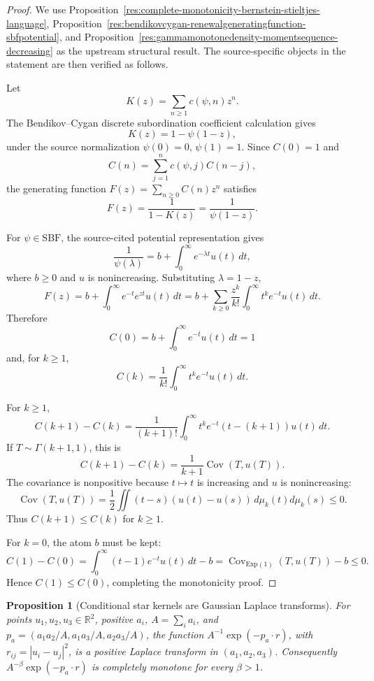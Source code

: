 \documentclass[11pt]{article}
\numberwithin{equation}{section}
\newtheorem{proposition}[theorem]{Proposition}
\theoremstyle{definition}
\theoremstyle{remark}
\newcommand{\1}{\mathbf 1}
\begin{document}
\begin{proof}
We use Proposition~\ref{res:complete-monotonicity-bernstein-stieltjes-language}, Proposition~\ref{res:bendikovcygan-renewalgeneratingfunction-sbfpotential}, and Proposition~\ref{res:gammamonotonedensity-momentsequence-decreasing} as the upstream structural result. The source-specific objects in the statement are then verified as follows.

Let
\[
K(z)=\sum_{n\ge1}c(\psi,n)z^n.
\]
The Bendikov--Cygan discrete subordination coefficient calculation gives
\[
K(z)=1-\psi(1-z),
\]
under the source normalization \(\psi(0)=0\), \(\psi(1)=1\). Since \(C(0)=1\) and
\[
C(n)=\sum_{j=1}^{n}c(\psi,j)C(n-j),
\]
the generating function \(F(z)=\sum_{n\ge0}C(n)z^n\) satisfies
\[
F(z)=\frac{1}{1-K(z)}=\frac{1}{\psi(1-z)}.
\]

For \(\psi\in\mathrm{SBF}\), the source-cited potential representation gives
\[
\frac{1}{\psi(\lambda)}
=b+\int_0^\infty e^{-\lambda t}u(t)\,dt,
\]
where \(b\ge0\) and \(u\) is nonincreasing. Substituting \(\lambda=1-z\),
\[
F(z)=b+\int_0^\infty e^{-t}e^{zt}u(t)\,dt
=b+\sum_{k\ge0}\frac{z^k}{k!}\int_0^\infty t^k e^{-t}u(t)\,dt.
\]
Therefore
\[
C(0)=b+\int_0^\infty e^{-t}u(t)\,dt=1
\]
and, for \(k\ge1\),
\[
C(k)=\frac1{k!}\int_0^\infty t^k e^{-t}u(t)\,dt.
\]

For \(k\ge1\),
\[
C(k+1)-C(k)
=\frac1{(k+1)!}\int_0^\infty t^k e^{-t}(t-(k+1))u(t)\,dt.
\]
If \(T\sim\Gamma(k+1,1)\), this is
\[
C(k+1)-C(k)=\frac1{k+1}\operatorname{Cov}(T,u(T)).
\]
The covariance is nonpositive because \(t\mapsto t\) is increasing and \(u\) is nonincreasing:
\[
\operatorname{Cov}(T,u(T))
=\frac12\iint (t-s)(u(t)-u(s))\,d\mu_k(t)d\mu_k(s)\le0.
\]
Thus \(C(k+1)\le C(k)\) for \(k\ge1\).

For \(k=0\), the atom \(b\) must be kept:
\[
C(1)-C(0)
=\int_0^\infty (t-1)e^{-t}u(t)\,dt-b
=\operatorname{Cov}_{\mathrm{Exp}(1)}(T,u(T))-b\le0.
\]
Hence \(C(1)\le C(0)\), completing the monotonicity proof.
\end{proof}

\begin{proposition}[Conditional star kernels are Gaussian Laplace transforms]
\label{res:conditionalstar-gaussianlaplacekernel}
For points \(u_1,u_2,u_3\in\mathbb R^2\), positive \(a_i\), \(A=\sum_i a_i\), and \(p_a=(a_1a_2/A,a_1a_3/A,a_2a_3/A)\), the function \(A^{-1}\exp(-p_a\cdot r)\), with \(r_{ij}=|u_i-u_j|^2\), is a positive Laplace transform in \((a_1,a_2,a_3)\). Consequently \(A^{-\beta}\exp(-p_a\cdot r)\) is completely monotone for every \(\beta>1\).
\end{proposition}
\end{document}
